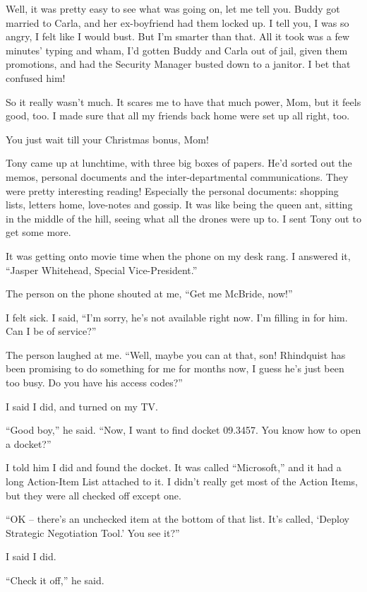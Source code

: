 Well, it was pretty easy to see what was going on, let me tell you. 
Buddy got married to Carla, and her ex-boyfriend had them locked up. I 
tell you, I was so angry, I felt like I would bust. But I'm smarter 
than that. All it took was a few minutes' typing and wham, I'd gotten 
Buddy and Carla out of jail, given them promotions, and had the 
Security Manager busted down to a janitor. I bet that confused him!

So it really wasn't much. It scares me to have that much power, Mom, 
but it feels good, too. I made sure that all my friends back home were 
set up all right, too.

You just wait till your Christmas bonus, Mom!

Tony came up at lunchtime, with three big boxes of papers. He'd sorted 
out the memos, personal documents and the inter-depart\-mental 
communications. They were pretty interesting reading! Especially the 
personal documents: shopping lists, letters home, love-notes and 
gossip. It was like being the queen ant, sitting in the middle of the 
hill, seeing what all the drones were up to. I sent Tony out to get 
some more.

It was getting onto movie time when the phone on my desk rang. I 
answered it, “Jasper Whitehead, Special Vice-President.”

The person on the phone shouted at me, “Get me McBride, now!”

I felt sick. I said, “I'm sorry, he's not available right now. I'm 
filling in for him. Can I be of service?”

The person laughed at me. “Well, maybe you can at that, son! 
Rhindquist has been promising to do something for me for months now, I 
guess he's just been too busy. Do you have his access codes?”

I said I did, and turned on my TV.

“Good boy,” he said. “Now, I want to find docket 09.3457. You 
know how to open a docket?”

I told him I did and found the docket. It was called “Microsoft,” 
and it had a long Action-Item List attached to it. I didn't really get 
most of the Action Items, but they were all checked off except one.

“OK -- there's an unchecked item at the bottom of that list. It's 
called, `Deploy Strategic Negotiation Tool.' You see it?”

I said I did.

“Check it off,” he said.

